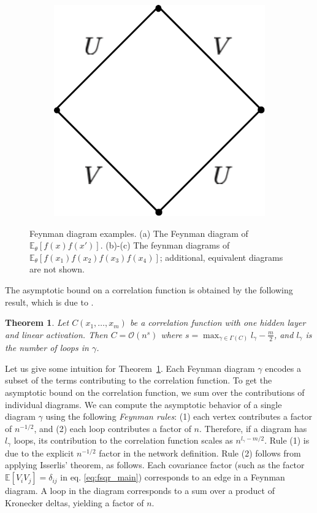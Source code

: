\documentclass[english]{article}
\newtheorem{thm}{Theorem}
\newcommand{\cO}{\ensuremath{\mathcal{O}}}
\newcommand{\lexp}{\mathbb{E}\left[}
\newcommand{\lexpp}[1]{\mathbb{E}_{#1}\left[}
\newcommand{\rexp}{\right]}
\begin{document}
\begin{figure}
\begin{subfigure}[b]{0.15\textwidth}
        \includegraphics[width=\textwidth]{new_figs/f_4_1hlb}
        \caption{}
        \label{fig:f_4_1hlb}
    \end{subfigure}
    \caption{Feynman diagram examples. (a) The Feynman diagram of $\lexpp{\theta} f(x) f(x') \rexp$. (b)-(c) The feynman diagrams of $\lexpp{\theta} f(x_1) f(x_2) f(x_3) f(x_4) \rexp$;
      additional, equivalent diagrams are not shown.
    } \label{fig:dl_4_1hl_0}
\end{figure}
The asymptotic bound on a correlation function is obtained by the following result, which is due to \cite{tHooft:1973alw}.
\begin{thm}\label{thm:rules}
  Let $C(x_1,\dots,x_m)$ be a correlation function with one hidden layer and linear activation.
  Then $C = \cO(n^s)$ where $s = \max_{\gamma \in \Gamma(C)} l_\gamma - \frac{m}{2}$, and $l_\gamma$ is the number of loops in $\gamma$.
\end{thm}
Let us give some intuition for Theorem~\ref{thm:rules}. 
Each Feynman diagram $\gamma$ encodes a subset of the terms contributing to the correlation function.
To get the asymptotic bound on the correlation function, we sum over the contributions of individual diagrams.
We can compute the asymptotic behavior of a single diagram $\gamma$ using the following \emph{Feynman rules}: (1) each vertex contributes a factor of $n^{-1/2}$, and (2) each loop contributes a factor of $n$.
Therefore, if a diagram has $l_\gamma$ loops, its contribution to the correlation function scales as $n^{l_\gamma - m/2}$.
Rule (1) is due to the explicit $n^{-1/2}$ factor in the network definition. 
Rule (2) follows from applying Isserlis' theorem, as follows.
Each covariance factor (such as the factor $\lexp V_i V_j \rexp = \delta_{ij}$ in eq. \eqref{eq:fsqr_main}) corresponds to an edge in a Feynman diagram.
A loop in the diagram corresponds to a sum over a product of Kronecker deltas, yielding a factor of $n$.
\end{document}
